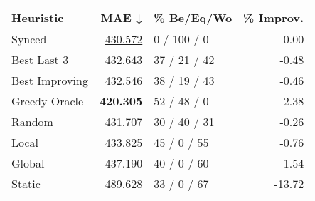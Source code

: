 \begin{tabular}{lrlr}
\toprule
\textbf{Heuristic} & \textbf{MAE ↓} & \textbf{\% Be/Eq/Wo} & \textbf{\% Improv.} \\
\midrule
            Synced &        \underline{430.572} &          0 / 100 / 0 &                0.00 \\
\midrule
       Best Last 3 &        432.643 &         37 / 21 / 42 &               -0.48 \\
    Best Improving &        432.546 &         38 / 19 / 43 &               -0.46 \\
\addlinespace
     Greedy Oracle &        \textbf{420.305} &          52 / 48 / 0 &                2.38 \\
            Random &        431.707 &         30 / 40 / 31 &               -0.26 \\
\midrule
             Local &        433.825 &          45 / 0 / 55 &               -0.76 \\
            Global &        437.190 &          40 / 0 / 60 &               -1.54 \\
\midrule
            Static &        489.628 &          33 / 0 / 67 &              -13.72 \\
\bottomrule
\end{tabular}

\label{tab:non_lr05_le2_bs2_Summary}
